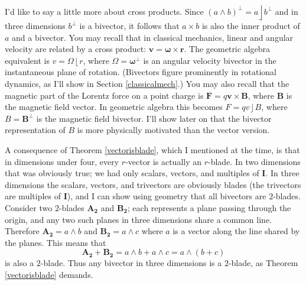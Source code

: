 \documentclass{utarticle}
\newcommand{\bl}[1]{\ensuremath{\bm{#1}}}
\newcommand{\I}{\bl{I}}
\DeclareMathOperator{\lin}{\rfloor}
\DeclareMathOperator{\rin}{\lfloor}
\DeclareMathOperator{\out}{\wedge}
\newcommand{\dual}[1]{\ensuremath{#1^\perp}}
\begin{document}
I'd like to say a little more about cross products.  Since $\dual{(a \out b)} = a \lin \dual{b}$
and in three dimensions \dual{b} is a bivector, it follows that $a \times b$ is also
the inner product of $a$ and a bivector.  You may recall that in classical mechanics, 
linear and angular velocity are related by a cross product: $\bm{v} = \bm{\omega} 
\times \bm{r}$.  The geometric algebra equivalent is $v = \Omega \rin r$, where $\Omega = 
\dual{\bm{\omega}}$ is an angular velocity bivector in the instantaneous plane 
of rotation.  (Bivectors figure prominently in rotational dynamics, as I'll show in Section 
\ref{classicalmech}.)  You may also recall that the magnetic part of the Lorentz force 
on a point charge is $\bm{F} = q \bm{v} \times \bm{B}$, where $\bm{B}$ is the magnetic 
field vector.  In geometric algebra this becomes $F = q v \lin B$, where $B = \dual{\bm{B}}$ 
is the magnetic field bivector.  I'll show later on that the bivector representation of $B$ 
is more physically motivated than the vector version.

A consequence of Theorem \ref{vectorisblade}, 
which I mentioned at the time, is that in dimensions under four, every $r$-vector 
is actually an $r$-blade.  In two dimensions that was obviously true; we had 
only scalars, vectors, and multiples of \I.  In three dimensions the scalars, 
vectors, and trivectors are obviously blades (the trivectors are multiples of \I), and 
I can show using geometry that all bivectors are $2$-blades.  Consider two 
$2$-blades \bl{A_2} and \bl{B_2}; each represents a plane passing through the
origin, and any two such planes in three dimensions share a common line.  
Therefore $\bl{A_2} = a \out b$ and $\bl{B_2} = a \out c$ where $a$ is a vector 
along the line shared by the planes.  This means that
\begin{equation} 
\bl{A_2} + \bl{B_2} = a \out b + a \out c = a \out (b+c) 
\end{equation}
is also a $2$-blade.  Thus any bivector in three dimensions is a
$2$-blade, as Theorem \ref{vectorisblade} demands.
\end{document}
